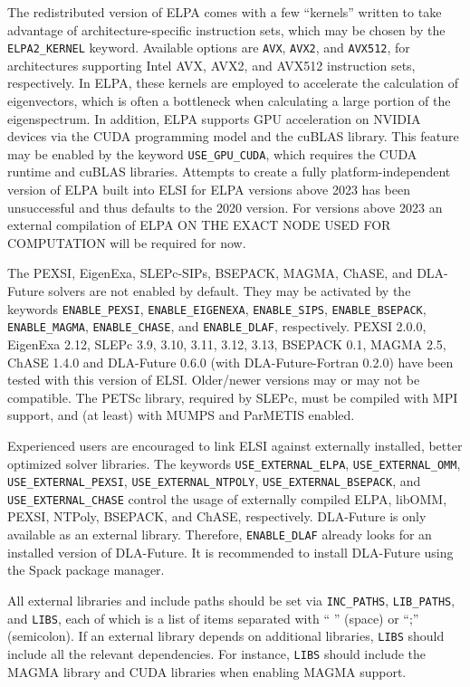 \documentclass{report}
\begin{document}
The redistributed version of ELPA comes with a few ``kernels'' written to
take advantage of architecture-specific instruction sets, which may be
chosen by the \texttt{ELPA2\_KERNEL} keyword. Available options are
\texttt{AVX}, \texttt{AVX2}, and \texttt{AVX512}, for architectures
supporting Intel AVX, AVX2, and AVX512 instruction sets, respectively. In
ELPA, these kernels are employed to accelerate the calculation of
eigenvectors, which is often a bottleneck when calculating a large portion
of the eigenspectrum. In addition, ELPA supports GPU acceleration on NVIDIA
devices via the CUDA programming model and the cuBLAS library. This feature
may be enabled by the keyword \texttt{USE\_GPU\_CUDA}, which requires the
CUDA runtime and cuBLAS libraries. Attempts to create a fully
platform-independent version of ELPA built into ELSI for ELPA versions
above 2023 has been unsuccessful and thus defaults to the 2020 version. For
versions above 2023 an external compilation of ELPA ON THE EXACT NODE USED
FOR COMPUTATION will be required for now.

The PEXSI, EigenExa, SLEPc-SIPs, BSEPACK, MAGMA, ChASE, and DLA-Future
solvers are not enabled by default. They may be activated by the keywords
\texttt{ENABLE\_PEXSI}, \texttt{ENABLE\_EIGENEXA}, \texttt{ENABLE\_SIPS},
\texttt{ENABLE\_BSEPACK}, \texttt{ENABLE\_MAGMA}, \texttt{ENABLE\_CHASE},
and \texttt{ENABLE\_DLAF}, respectively. PEXSI 2.0.0, EigenExa 2.12, SLEPc
3.9, 3.10, 3.11, 3.12, 3.13, BSEPACK 0.1, MAGMA 2.5, ChASE 1.4.0 and
  DLA-Future 0.6.0 (with DLA-Future-Fortran 0.2.0) have been tested with
  this version of ELSI. Older/newer versions may or may not be compatible.
  The PETSc library, required by SLEPc, must be compiled with MPI support,
  and (at least) with MUMPS and ParMETIS enabled.

Experienced users are encouraged to link ELSI against externally
installed, better optimized solver libraries. The keywords
\texttt{USE\_EXTERNAL\_ELPA}, \texttt{USE\_EXTERNAL\_OMM},
\texttt{USE\_EXTERNAL\_PEXSI}, \texttt{USE\_EXTERNAL\_NTPOLY},
\texttt{USE\_EXTERNAL\_BSEPACK}, and \texttt{USE\_EXTERNAL\_CHASE}
control the usage of externally compiled ELPA, libOMM, PEXSI, NTPoly,
BSEPACK, and ChASE, respectively. DLA-Future is only available as an external library.
Therefore, \texttt{ENABLE\_DLAF} already looks for an installed version of DLA-Future.
It is recommended to install DLA-Future using the Spack package manager.

All external libraries and include paths should be set via \texttt{INC\_PATHS}, \texttt{LIB\_PATHS}, and \texttt{LIBS}, each of which is a list of items separated with `` '' (space) or ``;'' (semicolon). If an external library depends on additional libraries, \texttt{LIBS} should include all the relevant dependencies. For instance, \texttt{LIBS} should include the MAGMA library and CUDA libraries when enabling MAGMA support.
\end{document}
